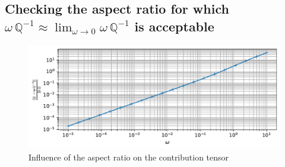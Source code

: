 \documentclass[
  letterpaper,
  DIV=11,
  numbers=noendperiod]{scrreprt}
\newenvironment{Shaded}{\begin{snugshade}}{\end{snugshade}}
\newcommand{\ControlFlowTok}[1]{\textcolor[rgb]{0.13,0.29,0.53}{\textbf{#1}}}
\newcommand{\DecValTok}[1]{\textcolor[rgb]{0.00,0.00,0.81}{#1}}
\newcommand{\KeywordTok}[1]{\textcolor[rgb]{0.13,0.29,0.53}{\textbf{#1}}}
\newcommand{\NormalTok}[1]{#1}
\newcommand{\OperatorTok}[1]{\textcolor[rgb]{0.81,0.36,0.00}{\textbf{#1}}}
\newcommand{\SpecialCharTok}[1]{\textcolor[rgb]{0.00,0.00,0.00}{#1}}
\newcommand{\StringTok}[1]{\textcolor[rgb]{0.31,0.60,0.02}{#1}}
\newcommand{\VariableTok}[1]{\textcolor[rgb]{0.00,0.00,0.00}{#1}}
\newcommand{\VerbatimStringTok}[1]{\textcolor[rgb]{0.31,0.60,0.02}{#1}}
\begin{document}
\hypertarget{checking-the-aspect-ratio-for-which-omegamathbbq-1approx-lim_omegato-0omegamathbbq-1-is-acceptable}{%
\subsection{\texorpdfstring{Checking the aspect ratio for which
\(\omega\,{\mathbb{{Q}}}^{-1}\approx \lim_{\omega\to 0}\omega\,{\mathbb{{Q}}}^{-1}\)
is
acceptable}{Checking the aspect ratio for which \textbackslash omega\textbackslash,\{\textbackslash mathbb\{\{Q\}\}\}\^{}\{-1\}\textbackslash approx \textbackslash lim\_\{\textbackslash omega\textbackslash to 0\}\textbackslash omega\textbackslash,\{\textbackslash mathbb\{\{Q\}\}\}\^{}\{-1\} is acceptable}}\label{checking-the-aspect-ratio-for-which-omegamathbbq-1approx-lim_omegato-0omegamathbbq-1-is-acceptable}}

\begin{Shaded}
\end{Shaded}

\begin{figure}[H]

{\centering \includegraphics{./Hill_tensor_files/figure-pdf/fig-error-output-1.pdf}

}

\caption{\label{fig-error}Influence of the aspect ratio on the
contribution tensor}

\end{figure}
\end{document}
